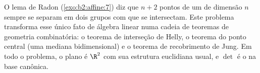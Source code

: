 \begin{problem}\label{pb:b2:affine:1}
O lema de Radon (\cref{exo:b2:affine:7}) diz que $n + 2$
pontos de um  de dimensão $n$ sempre se separam em
dois grupos com  que se intersectam. Este problema transforma
esse único fato de álgebra linear numa cadeia de teoremas de
geometria combinatória: o teorema de interseção de Helly, o
teorema do ponto central (uma mediana bidimensional) e o teorema
de recobrimento de Jung. Em todo o problema, o plano é $\R^2$ com sua
estrutura euclidiana usual, e $\det$ é o  na
base canônica.


\end{problem}
